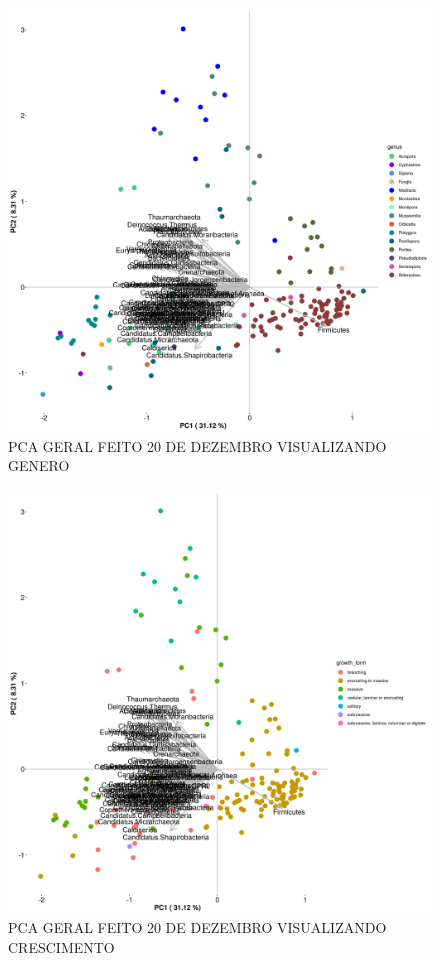 \documentclass[12pt, a4paper]{report}
\begin{document}
\begin{figure}[H]
	\centering
	\includegraphics[scale=0.4]{figures/PCA_corais_genus_2018_12_20.png}
	\caption{PCA GERAL FEITO 20 DE DEZEMBRO VISUALIZANDO GENERO}
	\label{fig: PCA GERAL FEITO DIA 20 DE DEZEMBRO VISUALIZANDO CATEGORIA GENERO}
\end{figure}

\begin{figure}[H]
	\centering
	\includegraphics[scale=0.4]{figures/PCA_growth_157_corais_2018_12_20.png}
	\caption{PCA GERAL FEITO 20 DE DEZEMBRO VISUALIZANDO CRESCIMENTO}
	\label{fig: PCA GERAL FEITO DIA 20 DE DEZEMBRO VISUALIZANDO CATEGORIA CRESCIMENTO}
\end{figure}
\end{document}
